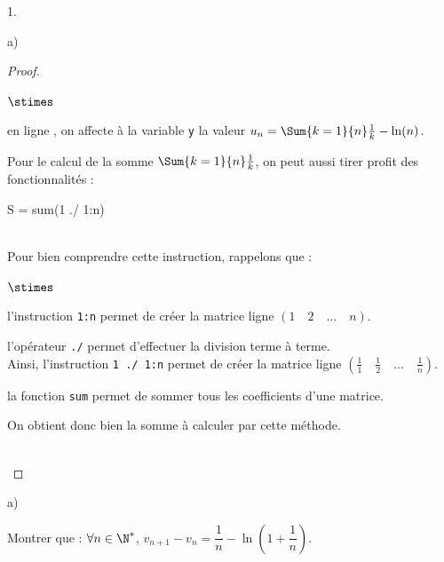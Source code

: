 \documentclass[11pt]{article}%
\begin{document}
\begin{noliste}{1.}
\begin{noliste}{a)}
\begin{proof}
\begin{noliste}{$\stimes$}
      \item en ligne , on affecte à la variable {\tt y} la
        valeur $u_n = \Sum{k=1}{n} \frac{1}{k} - \ln(n)$.        
      \end{noliste}
      \begin{remark}%
        Pour le calcul de la somme $\Sum{k=1}{n} \frac{1}{k}$, on peut
        aussi tirer profit des fonctionnalités \Scilab{} :\\%
        \begin{scilabNC} 
          \qquad S = sum(1 ./ 1:n)
        \end{scilabNC}~\\[-.2cm]
        Pour bien comprendre cette instruction, rappelons que : 
        \begin{noliste}{$\stimes$}
        \item l'instruction {\tt 1:n} permet de créer la matrice ligne
          $(1 \quad 2 \quad \ldots \quad n)$.
        \item l'opérateur {\tt ./} permet d'effectuer la division
          terme à terme.\\
          Ainsi, l'instruction {\tt 1 ./ 1:n} permet de créer la
          matrice ligne $(\frac{1}{1} \quad \frac{1}{2} \quad \ldots
          \quad \frac{1}{n})$.
        \item la fonction {\tt sum} permet de sommer tous les
          coefficients d'une matrice.
        \end{noliste}
        On obtient donc bien la somme à calculer par cette méthode.
      \end{remark}~\\[-1.4cm]
    \end{proof}
  \end{noliste}


  \newpage


\item 
  \begin{noliste}{a)}
    \setlength{\itemsep}{2mm}
  \item Montrer que : $\forall n \in \N^*$, $v_{n + 1}-v_{n} =
    \dfrac{1}{n} - \ln \left(1 + \dfrac{1}{n} \right)$.


\end{noliste}
\end{noliste}
\end{document}
